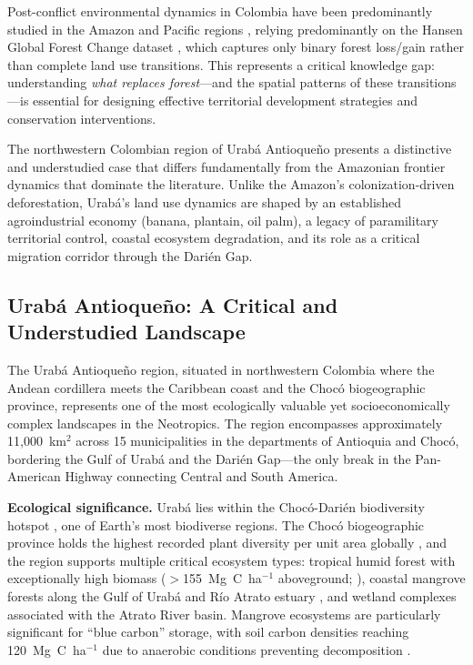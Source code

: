 \documentclass[12pt,a4paper]{article}
\begin{document}
Post-conflict environmental dynamics in Colombia have been predominantly studied in the Amazon and Pacific regions \citep{Prem2020,Clerici2020,MurilloSandoval2021,Negret2019}, relying predominantly on the Hansen Global Forest Change dataset \citep{Hansen2013}, which captures only binary forest loss/gain rather than complete land use transitions. This represents a critical knowledge gap: understanding \textit{what replaces forest}---and the spatial patterns of these transitions---is essential for designing effective territorial development strategies and conservation interventions.

The northwestern Colombian region of Urab\'{a} Antioque\~{n}o presents a distinctive and understudied case that differs fundamentally from the Amazonian frontier dynamics that dominate the literature. Unlike the Amazon's colonization-driven deforestation, Urab\'{a}'s land use dynamics are shaped by an established agroindustrial economy (banana, plantain, oil palm), a legacy of paramilitary territorial control, coastal ecosystem degradation, and its role as a critical migration corridor through the Dari\'{e}n Gap.

\subsection{Urab\'{a} Antioque\~{n}o: A Critical and Understudied Landscape}

The Urab\'{a} Antioque\~{n}o region, situated in northwestern Colombia where the Andean cordillera meets the Caribbean coast and the Choc\'{o} biogeographic province, represents one of the most ecologically valuable yet socioeconomically complex landscapes in the Neotropics. The region encompasses approximately 11,000~km$^2$ across 15 municipalities in the departments of Antioquia and Choc\'{o}, bordering the Gulf of Urab\'{a} and the Dari\'{e}n Gap---the only break in the Pan-American Highway connecting Central and South America.

\textbf{Ecological significance.} Urab\'{a} lies within the Choc\'{o}-Dari\'{e}n biodiversity hotspot \citep{Myers2000,Gentry1986}, one of Earth's most biodiverse regions. The Choc\'{o} biogeographic province holds the highest recorded plant diversity per unit area globally \citep{Gentry1986}, and the region supports multiple critical ecosystem types: tropical humid forest with exceptionally high biomass ($>$155~Mg~C~ha$^{-1}$ aboveground; \citealp{Phillips2019,Alvarez2012}), coastal mangrove forests along the Gulf of Urab\'{a} and R\'{i}o Atrato estuary \citep{BlancoLibreros2012,BlancoLibreros2015}, and wetland complexes associated with the Atrato River basin. Mangrove ecosystems are particularly significant for ``blue carbon'' storage, with soil carbon densities reaching 120~Mg~C~ha$^{-1}$ due to anaerobic conditions preventing decomposition \citep{Donato2011,Twilley2018,Alongi2014}.
\end{document}
